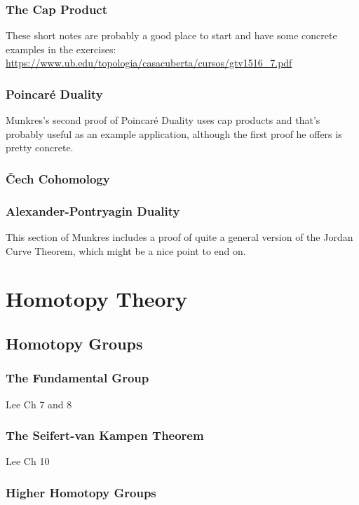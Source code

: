 \documentclass[oneside,english]{amsbook}
\numberwithin{section}{chapter}
\theoremstyle{plain}
\theoremstyle{definition}
\providecommand{\Cech}{\v{C}ech }
\begin{document}
	\section{The Cap Product}
	
	These short notes are probably a good place to start and have some concrete examples in the exercises: \url{https://www.ub.edu/topologia/casacuberta/cursos/gtv1516_7.pdf}
	
	\section{Poincar\'e Duality}
	
	Munkres's second proof of Poincar\'e Duality uses cap products and that's probably useful as an example application, although the first proof he offers is pretty concrete.
	
	\section{\Cech Cohomology}
	\section{Alexander-Pontryagin Duality}
	
	This section of Munkres includes a proof of quite a general version of the Jordan Curve Theorem, which might be a nice point to end on.
	
	\part{Homotopy Theory}
	
	\chapter{Homotopy Groups}
	
	\section{The Fundamental Group}
	
	Lee Ch 7 and 8
	
	\section{The Seifert-van Kampen Theorem}
	
	Lee Ch 10
	
	\section{Higher Homotopy Groups}
	
\end{document}
